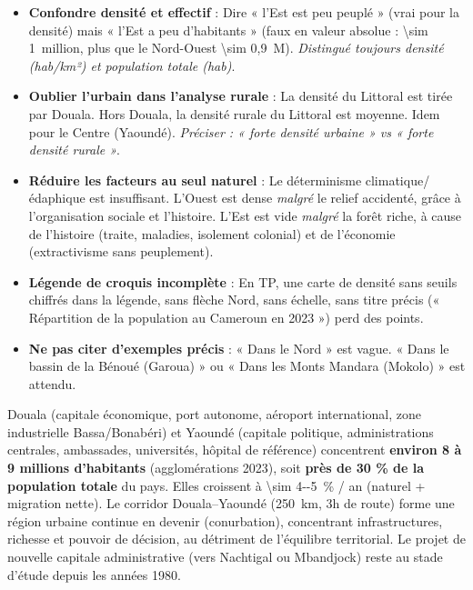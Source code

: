 \documentclass[11pt]{article}
\newcommand{\cle}[1]{{\popxbold\color{popdark}#1}}
\begin{document}
\begin{attention}
\begin{itemize}
\item \textbf{Confondre densité et effectif} : Dire « l'Est est peu peuplé » (vrai pour la densité) mais « l'Est a peu d'habitants » (faux en valeur absolue : \SI{\sim 1}{million}, plus que le Nord-Ouest \SI{\sim 0,9}{M}). \emph{Distingué toujours densité (hab/km²) et population totale (hab)}.
\item \textbf{Oublier l'urbain dans l'analyse rurale} : La densité du Littoral est tirée par Douala. Hors Douala, la densité rurale du Littoral est moyenne. Idem pour le Centre (Yaoundé). \emph{Préciser : « forte densité urbaine » vs « forte densité rurale »}.
\item \textbf{Réduire les facteurs au seul naturel} : Le déterminisme climatique/édaphique est insuffisant. L'Ouest est dense \emph{malgré} le relief accidenté, grâce à l'organisation sociale et l'histoire. L'Est est vide \emph{malgré} la forêt riche, à cause de l'histoire (traite, maladies, isolement colonial) et de l'économie (extractivisme sans peuplement).
\item \textbf{Légende de croquis incomplète} : En TP, une carte de densité sans seuils chiffrés dans la légende, sans flèche Nord, sans échelle, sans titre précis (« Répartition de la population au Cameroun en 2023 ») perd des points.
\item \textbf{Ne pas citer d'exemples précis} : « Dans le Nord » est vague. « Dans le bassin de la Bénoué (Garoua) » ou « Dans les Monts Mandara (Mokolo) » est attendu.
\end{itemize}
\end{attention}

\begin{savaistu}
Douala (capitale économique, port autonome, aéroport international, zone industrielle Bassa/Bonabéri) et Yaoundé (capitale politique, administrations centrales, ambassades, universités, hôpital de référence) concentrent \textbf{environ 8 à 9 millions d'habitants} (agglomérations 2023), soit \textbf{près de 30 \% de la population totale} du pays. Elles croissent à \SI{\sim 4--5}{\%} / an (naturel + migration nette). Le corridor Douala--Yaoundé (\SI{250}{km}, 3h de route) forme une \cle{région urbaine continue} en devenir (conurbation), concentrant infrastructures, richesse et pouvoir de décision, au détriment de l'équilibre territorial. Le projet de nouvelle capitale administrative (vers Nachtigal ou Mbandjock) reste au stade d'étude depuis les années 1980.
\end{savaistu}
\end{document}
